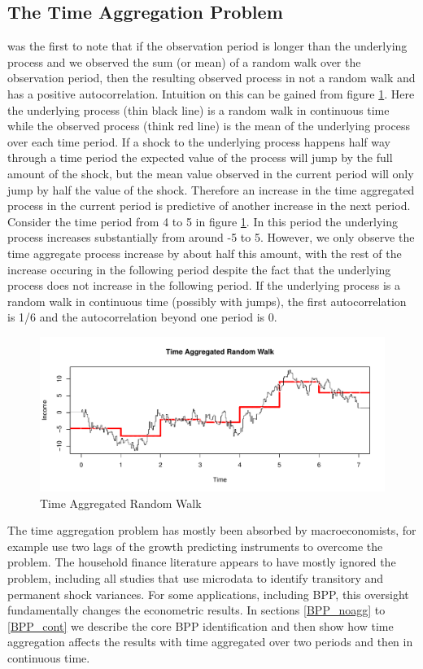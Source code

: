 \documentclass[titlepage]{\econtex}\newcommand{\texname}{IncomeUncertainty}
\begin{document}
\subsection{The Time Aggregation Problem}
\cite{working_note_1960} was the first to note that if the observation period is longer than the underlying process and we observed the sum (or mean) of a random walk over the observation period, then the resulting observed process in not a random walk and has a positive autocorrelation. Intuition on this can be gained from figure \ref{fig:TimeAgg}. Here the underlying process (thin black line) is a random walk in continuous time while the observed process (think red line) is the mean of the underlying process over each time period. If a shock to the underlying process happens half way through a time period the expected value of the process will jump by the full amount of the shock, but the mean value observed in the current period will only jump by half the value of the shock. Therefore an increase in the time aggregated process in the current period is predictive of another increase in the next period. Consider the time period from 4 to 5 in figure \ref{fig:TimeAgg}. In this period the underlying process increases substantially from around -5 to 5. However, we only observe the time aggregate process increase by about half this amount, with the rest of the increase occuring in the following period despite the fact that the underlying process does not increase in the following period. If the underlying process is a random walk in continuous time (possibly with jumps), the first autocorrelation is 1/6 and the autocorrelation beyond one period is 0.
	\begin{figure} 
	\begin{centering}
		\includegraphics[scale=0.7]{Figures/timeagg_rw.pdf} 
		\caption{Time Aggregated Random Walk}
		\label{fig:TimeAgg}
	\end{centering}
\end{figure}
The time aggregation problem has mostly been absorbed by macroeconomists, for example \cite{campbell_consumption_1989} use two lags of the growth predicting instruments to overcome the problem. The household finance literature appears to have mostly ignored the problem, including all studies that use microdata to identify transitory and permanent shock variances. For some applications, including BPP, this oversight fundamentally changes the econometric results. In sections \ref{BPP_noagg} to \ref{BPP_cont} we describe the core BPP identification and then show how time aggregation affects the results with time aggregated over two periods and then in continuous time.
\end{document}
